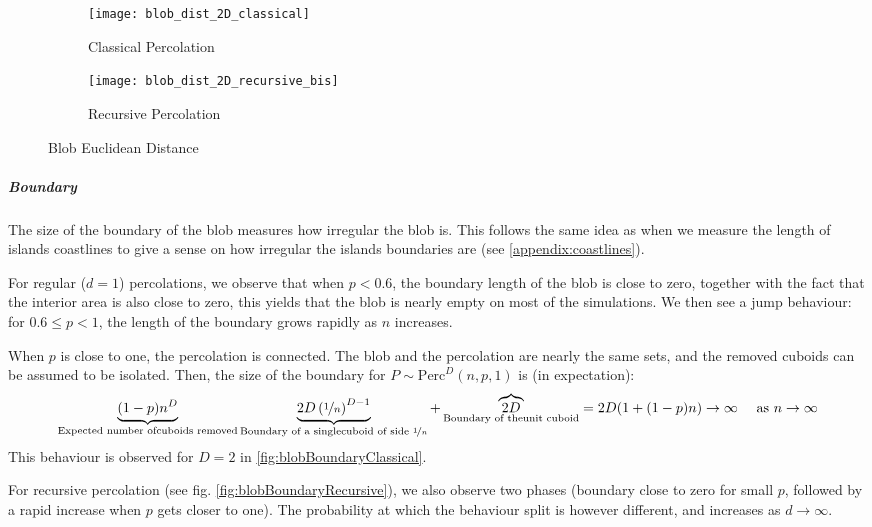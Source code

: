 \begin{figure}[!h]
	\centering
	\begin{subfigure}{.49\textwidth}
		\texttt{[image: blob\_dist\_2D\_classical]}
		\centering
		\caption{Classical Percolation}
		\label{fig:blobEuclideanDistanceClassical}
	\end{subfigure}
	\begin{subfigure}{.49\textwidth}
		\texttt{[image: blob\_dist\_2D\_recursive\_bis]}
		\centering
		\caption{Recursive Percolation}
		\label{fig:blobEuclideanDistanceRecursive}
	\end{subfigure}
	\caption{Blob Euclidean Distance}
	\label{fig:blobEuclideanDistance}
\end{figure}


\subparagraph{Boundary}
The size of the boundary of the blob measures how irregular the blob is.
This follows the same idea as when we measure the length of islands coastlines to give a sense on how irregular the islands boundaries are (see \ref{appendix:coastlines}).

For regular ($d=1$) percolations, we observe that when $p<0.6$, the boundary length of the blob is close to zero, together with the fact that the interior area is also close to zero, this yields that the blob is nearly empty on most of the simulations.
We then see a jump behaviour: for $0.6 \leq p <1$, the length of the boundary grows rapidly as $n$ increases.

When $p$ is close to one, the percolation is connected.
The blob and the percolation are nearly the same sets, and the removed cuboids can be assumed to be isolated.
Then, the size of the boundary for $P \sim \text{Perc}^D(n,p,1)$ is (in expectation):
$$\underbrace{(1-p)n^D}_{\text{Expected number of\\cuboids removed}} \underbrace{2D \left( \nicefrac{1}{n} \right)^{D-1}}_{\text{Boundary of a single\\cuboid of side } \nicefrac{1}{n}}
+ \overbrace{2D}_{\text{Boundary of the\\unit cuboid}} = 2D (1 + (1-p)n) \to \infty \quad \text{ as } n \to \infty$$
This behaviour is observed for $D=2$ in \ref{fig:blobBoundaryClassical}.

For recursive percolation (see fig. \ref{fig:blobBoundaryRecursive}), we also observe two phases (boundary close to zero for small $p$, followed by a rapid increase when $p$ gets closer to one).
The probability at which the behaviour split is however different, and increases as $d \to \infty$.

